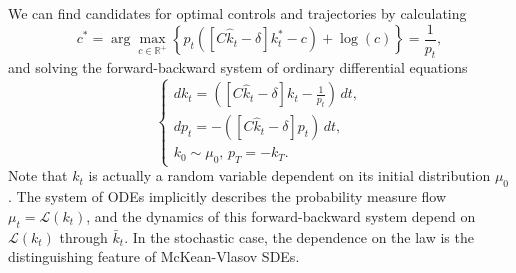 We can find candidates for optimal controls and trajectories by calculating
\begin{equation*}
    c^* = \arg\max_{c \in \mathbb{R}^+}  \left\{ p_t\left( \left[C {\hat k_t} - \delta \right]k^*_t - c \right) + \log(c) \right\} = \frac{1}{p_t},
\end{equation*}
and solving the forward-backward system of ordinary differential equations
\begin{equation}\label{economic_example:ode_formulation}
    \begin{cases}
         d k_t = \left(\left[ C {\hat k_t} - \delta \right] k_t - \frac{1}{p_t} \right)\, dt,\\
         d p_t = - \left( \left[C{\hat k_t} - \delta \right] p_t \right) \, dt, \\
         k_0 \sim \mu_0,\, p_T =  - k_T.         
    \end{cases}
\end{equation}
    Note that $k_t$ is actually a random variable dependent on its initial distribution $\mu_0$.
    The system of ODEs implicitly describes the probability measure flow $\mu_t = \mathcal{L}(k_t)$,
    and the dynamics of this forward-backward system depend on $\mathcal{L}(k_t)$ through $\bar k_t$.
    In the stochastic case, the dependence on the law is the distinguishing feature of McKean-Vlasov SDEs.

